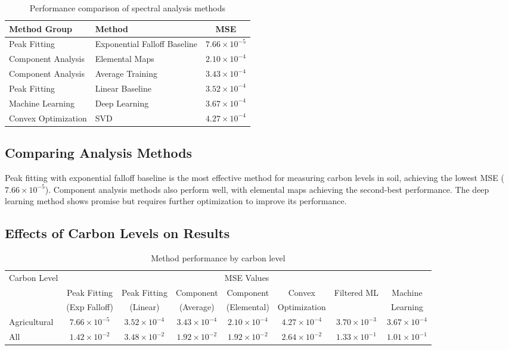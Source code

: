 \documentclass[review]{elsarticle}
\begin{document}
\begin{table}[H]
\centering
\caption{Performance comparison of spectral analysis methods}
\label{tab:results}
\begin{tabular}{llc}
\toprule
Method Group & Method & MSE \\
\midrule
Peak Fitting & Exponential Falloff Baseline & $7.66 \times 10^{-5}$ \\
Component Analysis & Elemental Maps & $2.10 \times 10^{-4}$ \\
Component Analysis & Average Training & $3.43 \times 10^{-4}$ \\
Peak Fitting & Linear Baseline & $3.52 \times 10^{-4}$ \\
Machine Learning & Deep Learning & $3.67 \times 10^{-4}$ \\
Convex Optimization & SVD & $4.27 \times 10^{-4}$ \\
\bottomrule
\end{tabular}
\end{table}

\subsection{Comparing Analysis Methods}

Peak fitting with exponential falloff baseline is the most effective method for measuring carbon levels in soil, achieving the lowest MSE ($7.66 \times 10^{-5}$). Component analysis methods also perform well, with elemental maps achieving the second-best performance. The deep learning method shows promise but requires further optimization to improve its performance.

\subsection{Effects of Carbon Levels on Results}

\begin{table}[H]
\centering
\caption{Method performance by carbon level}
\label{tab:carbon_level_effects}
\begin{tabular}{lccccccc}
\toprule
Carbon Level & \multicolumn{7}{c}{MSE Values} \\
\cmidrule(lr){2-8}
& Peak Fitting & Peak Fitting & Component & Component & Convex & Filtered ML & Machine \\
& (Exp Falloff) & (Linear) & (Average) & (Elemental) & Optimization & & Learning \\
\midrule
Agricultural & $7.66 \times 10^{-5}$ & $3.52 \times 10^{-4}$ & $3.43 \times 10^{-4}$ & $2.10 \times 10^{-4}$ & $4.27 \times 10^{-4}$ & $3.70 \times 10^{-3}$ & $3.67 \times 10^{-4}$ \\
All & $1.42 \times 10^{-2}$ & $3.48 \times 10^{-2}$ & $1.92 \times 10^{-2}$ & $1.92 \times 10^{-2}$ & $2.64 \times 10^{-2}$ & $1.33 \times 10^{-1}$ & $1.01 \times 10^{-1}$ \\
\bottomrule
\end{tabular}
\end{table}
\end{document}
